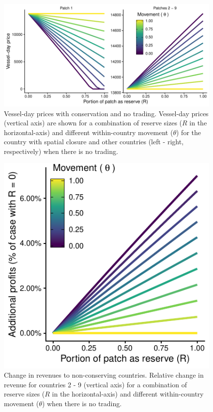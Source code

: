 \documentclass[12pt]{article}
\begin{document}
\begin{figure}[htbp]
\centering
\includegraphics{img/vessel_day_price_no_trading_plot.pdf}
\caption{\label{fig:vessel_day_price_no_trading_plot}Vessel-day prices with conservation and no trading. Vessel-day prices (vertical axis) are shown for a combination of reserve sizes ($R$ in the horizontal-axis) and different within-country movement ($\theta$) for the country with spatial closure and other countries (left - right, respectively) when there is no trading.}
\end{figure}

\begin{figure}[htbp]
\centering
\includegraphics{img/profits_PNA_notKIR_no_trading_plot.pdf}
\caption{\label{fig:profits_PNA_notKIR_no_trading_plot}Change in revenues to non-conserving countries. Relative change in revenue for countries 2 - 9 (vertical axis) for a combination of reserve sizes ($R$ in the horizontal-axis) and different within-country movement ($\theta$) when there is no trading.}
\end{figure}
\end{document}
